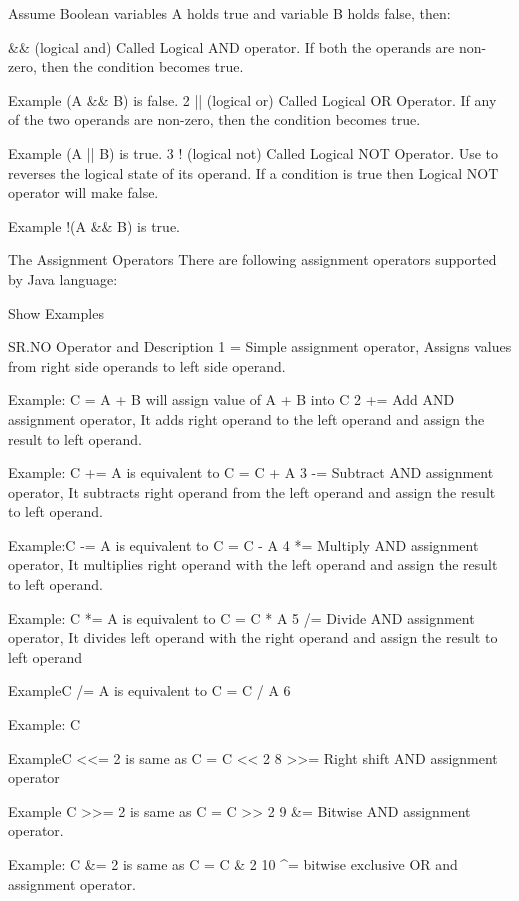 Assume Boolean variables A holds true and variable B holds false, then:

&& (logical and) Called Logical AND operator. If both the operands are non-zero, then the condition becomes true.

Example (A && B) is false. 2 || (logical or) Called Logical OR Operator. If any of the two operands are non-zero, then the condition becomes true.

Example (A || B) is true. 3 ! (logical not) Called Logical NOT Operator. Use to reverses the logical state of its operand. If a condition is true then Logical NOT operator will make false.

Example !(A && B) is true.

The Assignment Operators
There are following assignment operators supported by Java language:

Show Examples

SR.NO Operator and Description 1 = Simple assignment operator, Assigns values from right side operands to left side operand.

Example: C = A + B will assign value of A + B into C 2 += Add AND assignment operator, It adds right operand to the left operand and assign the result to left operand.

Example: C += A is equivalent to C = C + A 3 -= Subtract AND assignment operator, It subtracts right operand from the left operand and assign the result to left operand.

Example:C -= A is equivalent to C = C - A 4 *= Multiply AND assignment operator, It multiplies right operand with the left operand and assign the result to left operand.

Example: C *= A is equivalent to C = C * A 5 /= Divide AND assignment operator, It divides left operand with the right operand and assign the result to left operand

ExampleC /= A is equivalent to C = C / A 6 %

Example: C %

ExampleC <<= 2 is same as C = C << 2 8 >>= Right shift AND assignment operator

Example C >>= 2 is same as C = C >> 2 9 &= Bitwise AND assignment operator.

Example: C &= 2 is same as C = C & 2 10 ^= bitwise exclusive OR and assignment operator.


